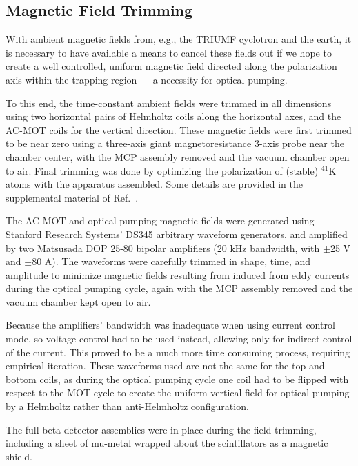 \FloatBarrier
\subsection{Magnetic Field Trimming}
\label{sec:trimming}
With ambient magnetic fields from, e.g., the TRIUMF cyclotron and the earth, it is necessary to have available a means to cancel these fields out if we hope to create a well controlled, uniform magnetic field directed along the polarization axis within the trapping region --- a necessity for optical pumping.  

To this end, the time-constant ambient fields were trimmed in all dimensions using two horizontal pairs of Helmholtz coils along the horizontal axes, and the AC-MOT coils for the vertical direction.
These magnetic fields were first trimmed to be near zero using a three-axis giant magnetoresistance 3-axis probe near the chamber center, with the \ac{MCP} assembly removed and the vacuum chamber open to air.
%
Final trimming was done by optimizing the polarization of (stable) $^{41}$K atoms with the apparatus assembled.  Some details are provided in the supplemental material of Ref.~\cite{ben_Abeta}. 


The AC-MOT and optical pumping magnetic fields were generated using Stanford Research Systems' DS345 arbitrary waveform generators, and amplified by two \mbox{Matsusada} DOP 25-80 bipolar amplifiers (20 kHz bandwidth, with $\pm$25 V and $\pm$80 A).
The waveforms were carefully trimmed in shape, time, and amplitude to minimize magnetic fields resulting from induced from eddy currents during the optical pumping cycle, again with the MCP assembly removed and the vacuum chamber kept open to air.

Because the amplifiers' bandwidth was inadequate when using current control mode, so voltage control had to be used instead, allowing only for indirect control of the current.  This proved to be a much more time consuming process, requiring empirical iteration.  
These waveforms used are not the same for the top and bottom coils, as during the optical pumping cycle one coil had to be flipped with respect to the MOT cycle to create the uniform vertical field for optical pumping by a Helmholtz rather than anti-Helmholtz configuration.


The full beta detector assemblies were in place during the field trimming, including a sheet of mu-metal wrapped about the scintillators as a magnetic shield.  


